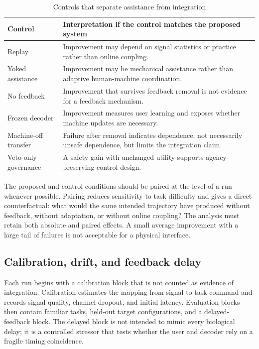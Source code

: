\documentclass[conference]{IEEEtran}
\begin{document}
\begin{table}[t]
\caption{Controls that separate assistance from integration}
\label{tab:controls}
\centering
\scriptsize
\begin{tabular}{p{}p{}}
\toprule
Control & Interpretation if the control matches the proposed system\\
\midrule
Replay & Improvement may depend on signal statistics or practice rather than online coupling.\\
Yoked assistance & Improvement may be mechanical assistance rather than adaptive human-machine coordination.\\
No feedback & Improvement that survives feedback removal is not evidence for a feedback mechanism.\\
Frozen decoder & Improvement measures user learning and exposes whether machine updates are necessary.\\
Machine-off transfer & Failure after removal indicates dependence, not necessarily unsafe dependence, but limits the integration claim.\\
Veto-only governance & A safety gain with unchanged utility supports agency-preserving control design.\\
\bottomrule
\end{tabular}
\end{table}

The proposed and control conditions should be paired at the level of a run whenever possible. Pairing reduces sensitivity to task difficulty and gives a direct counterfactual: what would the same intended trajectory have produced without feedback, without adaptation, or without online coupling? The analysis must retain both absolute and paired effects. A small average improvement with a large tail of failures is not acceptable for a physical interface.

\subsection{Calibration, drift, and feedback delay}

Each run begins with a calibration block that is not counted as evidence of integration. Calibration estimates the mapping from signal to task command and records signal quality, channel dropout, and initial latency. Evaluation blocks then contain familiar tasks, held-out target configurations, and a delayed-feedback block. The delayed block is not intended to mimic every biological delay; it is a controlled stressor that tests whether the user and decoder rely on a fragile timing coincidence.
\end{document}
